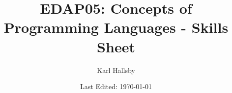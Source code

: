 

\usepackage[outputdir=./TeX_Output]{minted} %

% 


\begin{titlepage}
  \title{EDAP05: Concepts of Programming Languages - Skills Sheet}
  \author{Karl Hallsby}
  \date{Last Edited: \today} %
\end{titlepage}


\maketitle
{} %
\tableofcontents
\clearpage
{} %















